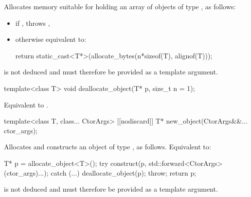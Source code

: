 \begin{itemdescr}
\pnum
\effects
Allocates memory suitable for holding
an array of  objects of type , as follows:
\begin{itemize}
\item
  if ,
  throws ,
\item
  otherwise equivalent to:
\begin{codeblock}
return static_cast<T*>(allocate_bytes(n*sizeof(T), alignof(T)));
\end{codeblock}
\end{itemize}

\pnum
\begin{note}
 is not deduced and must therefore be provided as a template argument.
\end{note}
\end{itemdescr}

%
\begin{itemdecl}
template<class T>
  void deallocate_object(T* p, size_t n = 1);
\end{itemdecl}

\begin{itemdescr}
\pnum
\effects
Equivalent to .
\end{itemdescr}

%
\begin{itemdecl}
template<class T, class... CtorArgs>
  [[nodiscard]] T* new_object(CtorArgs&&... ctor_args);
\end{itemdecl}

\begin{itemdescr}
\pnum
\effects
Allocates and constructs an object of type , as follows.\newline
Equivalent to:
\begin{codeblock}
T* p = allocate_object<T>();
try {
  construct(p, std::forward<CtorArgs>(ctor_args)...);
} catch (...) {
  deallocate_object(p);
  throw;
}
return p;
\end{codeblock}

\pnum
\begin{note}
 is not deduced and must therefore be provided as a template argument.
\end{note}
\end{itemdescr}

